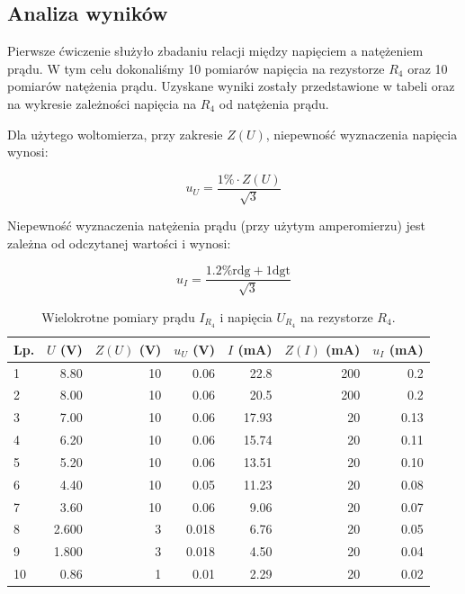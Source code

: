 \documentclass[a4paper]{article}
\begin{document}
\subsection{Analiza wyników}

Pierwsze ćwiczenie służyło zbadaniu relacji między napięciem a natężeniem prądu.
W tym celu dokonaliśmy 10 pomiarów napięcia na rezystorze $R_4$ oraz 10 pomiarów natężenia prądu.
Uzyskane wyniki zostały przedstawione w tabeli oraz na wykresie zależności napięcia na $R_4$ od natężenia prądu.

Dla użytego woltomierza, przy zakresie $Z(U)$, niepewność wyznaczenia napięcia wynosi:

$$u_U = \frac{1\% \cdot Z(U)}{\sqrt{3}}$$

Niepewność wyznaczenia natężenia prądu (przy użytym amperomierzu) jest zależna od odczytanej wartości i wynosi:

$$u_I = \frac{1.2\% \text{rdg} + 1 \text{dgt}}{\sqrt{3}}$$

\begin{table}
\centering
\begin{tabular}{lrrrrrr}
\toprule
Lp. &  $U$ (V) &  $Z(U)$ (V) &  $u_U$ (V) &  $I$ (mA) &  $Z(I)$ (mA) &  $u_I$ (mA) \\
\midrule
1 &          8.80  &                10 &                 0.06  &             22.8  &                 200 &                     0.2 \\
2 &          8.00  &                10 &                 0.06  &             20.5  &                 200 &                     0.2 \\
3 &          7.00  &                10 &                 0.06  &             17.93 &                  20 &                     0.13 \\
4 &          6.20  &                10 &                 0.06  &             15.74 &                  20 &                     0.11 \\
5 &          5.20  &                10 &                 0.06  &             13.51 &                  20 &                     0.10 \\
6 &          4.40  &                10 &                 0.05  &             11.23 &                  20 &                     0.08 \\
7 &          3.60  &                10 &                 0.06  &              9.06 &                  20 &                     0.07 \\
8 &          2.600  &                 3 &                 0.018 &              6.76 &                  20 &                     0.05 \\
9 &          1.800  &                 3 &                 0.018 &              4.50 &                  20 &                     0.04 \\
10 &         0.86 &                 1 &                 0.01 &              2.29 &                  20 &                     0.02 \\
\bottomrule
\end{tabular}
\caption{Wielokrotne pomiary prądu $I_{R_4}$ i napięcia $U_{R_4}$ na rezystorze $R_4$.}
\end{table}
\end{document}
